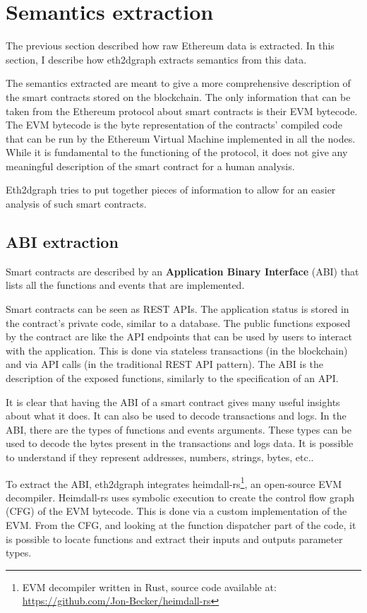 \section{Semantics extraction}

The previous section described how raw Ethereum data is extracted. In this section, I describe how eth2dgraph extracts semantics from this data.

The semantics extracted are meant to give a more comprehensive description of the smart contracts stored on the blockchain. The only information that can be taken from the Ethereum protocol about smart contracts is their EVM bytecode. The EVM bytecode is the byte representation of the contracts' compiled code that can be run by the Ethereum Virtual Machine implemented in all the nodes. While it is fundamental to the functioning of the protocol, it does not give any meaningful description of the smart contract for a human analysis. 

Eth2dgraph tries to put together pieces of information to allow for an easier analysis of such smart contracts.

\subsection{ABI extraction}

\label{decompilation-section}
Smart contracts are described by an \textbf{Application Binary Interface} (ABI) that lists all the functions and events that are implemented. 

Smart contracts can be seen as REST APIs. The application status is stored in the contract's private code, similar to a database.
The public functions exposed by the contract are like the API endpoints that can be used by users to interact with the application. This is done via stateless transactions (in the blockchain) and via API calls (in the traditional REST API pattern). The ABI is the description of the exposed functions, similarly to the specification of an API. 

It is clear that having the ABI of a smart contract gives many useful insights about what it does. It can also be used to decode transactions and logs. In the ABI, there are the types of functions and events arguments. These types can be used to decode the bytes present in the transactions and logs data. It is possible to understand if they represent addresses, numbers, strings, bytes, etc..

To extract the ABI, eth2dgraph integrates heimdall-rs\footnote{EVM decompiler written in Rust, source code available at: \url{https://github.com/Jon-Becker/heimdall-rs}}, an open-source EVM decompiler. Heimdall-rs uses symbolic execution to create the control flow graph (CFG) of the EVM bytecode. This is done via a custom implementation of the EVM. From the CFG, and looking at the function dispatcher part of the code, it is possible to locate functions and extract their inputs and outputs parameter types.

